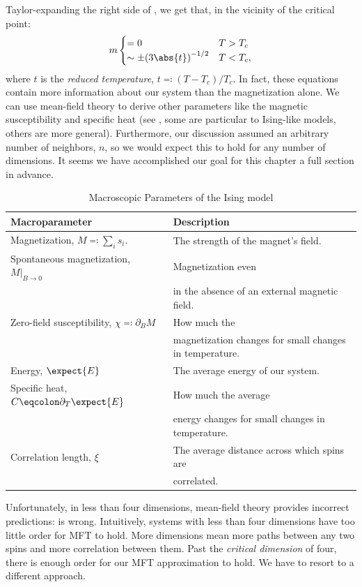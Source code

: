 Taylor-expanding the right side of , we get
that, in the vicinity of the critical point:%
\begin{equation}%
  m
  \begin{cases}
    =0 & T>T_c\\
    \sim \pm {(3\abs{t})}^{-1/2} & T<T_c,
  \end{cases}\label{eq:mft-magnetization}
\end{equation}%
where $t$ is the \textit{reduced temperature}, $t\eqcolon(T-T_c)/T_c$.
In fact, these equations contain more information about our system
than the magnetization alone. We can use mean-field theory to derive
other parameters like the magnetic susceptibility and specific heat
(see , some are particular to Ising-like
models, others are more general). Furthermore, our discussion assumed
an arbitrary number of neighbors, $n$, so we would expect this to hold
for any number of dimensions. It seems we have accomplished our goal
for this chapter a full section in advance.
%
\begin{center}\label{tab:macroparameters}
  \begin{table}
  \caption{Macroscopic Parameters of the Ising model}
  \begin{tabular}{ll}
    \toprule
    Macroparameter & Description\\
    \midrule
    Magnetization, $M\eqcolon\sum_i s_i$. & The strength of the magnet's field.\\
    Spontaneous magnetization, $M\rvert_{B\rightarrow 0}$ & Magnetization even\\
    &in the absence of an external magnetic field.\\
    Zero-field susceptibility, $\chi \eqcolon\partial_B M$ & How much the \\
    &magnetization changes for small changes in temperature.\\
    Energy, $\expect{E}$ & The average energy of our system.\\
    Specific heat, $C\eqcolon\partial_T \expect{E}$ & How much the average \\
    &energy changes for small changes in temperature.\\
    Correlation length, $\xi$ & The average distance across which spins are \\
    &correlated.\\
    \bottomrule
  \end{tabular}
  \end{table}
\end{center}
%
Unfortunately, in less than four dimensions, mean-field theory
provides incorrect predictions:  is
wrong. Intuitively, systems with less than four dimensions have too
little order for MFT to hold. More dimensions mean more paths between
any two spins and more correlation between them. Past the
\textit{critical dimension} of four, there is enough order for our MFT
approximation to hold. We have to resort to a different approach.

